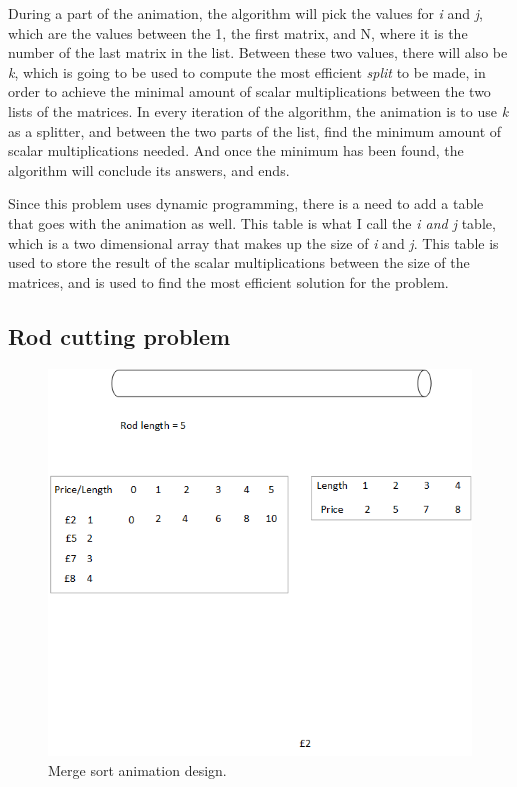 During a part of the animation, the algorithm will pick the values for \textit{i} and \textit{j}, which are the values between the 1, the first matrix, and N, where it is the number of the last matrix in the list. Between these two values, there will also be \textit{k}, which is going to be used to compute the most efficient \textit{split} to be made, in order to achieve the minimal amount of scalar multiplications between the two lists of the matrices. In every iteration of the algorithm, the animation is to use \textit{k} as a splitter, and between the two parts of the list, find the minimum amount of scalar multiplications needed. And once the minimum has been found, the algorithm will conclude its answers, and ends.

Since this problem uses dynamic programming, there is a need to add a table that goes with the animation as well. This table is what I call the \textit{i and j} table, which is a two dimensional array that makes up the size of \textit{i} and \textit{j}. This table is used to store the result of the scalar multiplications between the size of the matrices, and is used to find the most efficient solution for the problem. 

\subsection{Rod cutting problem}

\begin{figure}[H]
\centering
\includegraphics[scale=0.9]{images/report_images/animationDesignRodCuttingProblem.png}
\caption{Merge sort animation design.}
\label{animationDesignMergeSort}
\end{figure}

